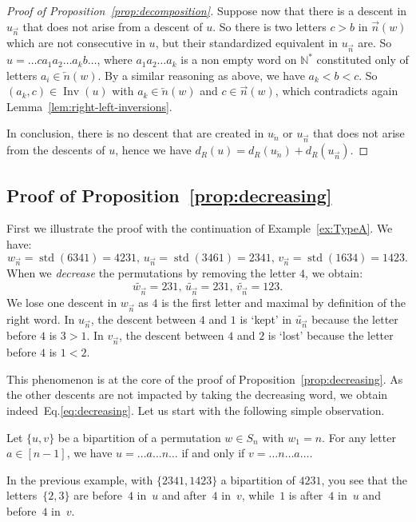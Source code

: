 \documentclass[Unicode]{cedram-alco}
\theoremstyle{definition}
\DeclareMathOperator{\std}{std}
\DeclareMathOperator{\invs}{Inv}
\newcommand{\dec}[1]{\widetilde{#1}}
\newcommand{\R}{{\overrightarrow{n}}}
\newcommand{\LL}{{\overleftarrow{n}}}
\newcommand{\dd}{d_R}
\begin{document}
\begin{proof}[Proof of Proposition~\ref{prop:decomposition}]
Suppose now that there is a descent in $u_\R$ that does not arise from a descent of $u$. So there is two letters $c > b$ in $\R(w)$ which are not consecutive in $u$, but their standardized equivalent in $u_\R$ are. So $u=\dots c a_1a_2\dots a_k b\dots$, where $a_1a_2\dots a_k$ is a non empty word on $\mathbb N^*$ constituted only of letters  $a_i\in\LL(w)$. By a similar reasoning as above, we have $a_k < b<c$. So $(a_k,c)\in\invs(u)$ with $a_k\in\LL(w)$ and $c\in\R(w)$, which contradicts again Lemma~\ref{lem:right-left-inversions}. 

In conclusion, there is no descent that are created in $u_\LL$ or $u_\R$ that does not arise from the descents of $u$, hence we have $\dd(u) = \dd(u_\LL) + \dd(u_\R).$
\end{proof}


\subsection{Proof of Proposition~\ref{prop:decreasing}} First we illustrate the proof with the continuation of Example~\ref{ex:TypeA}. We have:
$$
w_\R = \std(6341) = 4231, \, u_\R = \std(3461) = 2341, \, v_\R = \std(1634) = 1423.
$$
When we \emph{decrease} the permutations by removing the letter $4$, we obtain:
$$
\dec{w_\R} = 231, \,
\dec{u_\R} = 231, \,
\dec{v_\R} = 123.
$$
We lose one descent in $w_\R$ as $4$ is the first letter and maximal by definition of the right word. In $u_\R$, the descent between $4$ and $1$ is `kept' in $\dec{u_\R}$ because the letter before $4$ is $3 > 1$. In $v_\R$, the descent between $4$ and $2$ is `lost' because the letter before $4$ is $1 < 2$. 


This phenomenon is at the core of the proof of Proposition~\ref{prop:decreasing}. As the other descents are not impacted by taking the decreasing word, we obtain indeed~Eq.\eqref{eq:decreasing}. Let us start with the following simple observation.

\begin{lemm}
\label{lem:right-word-letters}
Let $\lbrace u, v \rbrace$ be a bipartition of a permutation $w \in S_n$ with $w_1 = n$. For any letter $a\in[n-1]$, we have $u=\dots a \dots n\dots$ if and only if $v=\dots n\dots a\dots$.
\end{lemm}

In the previous example, with $\lbrace 2341, 1423 \rbrace$ a bipartition of $4231$, you see that the letters~$\lbrace 2, 3 \rbrace$ are before~$4$ in~$u$ and after~$4$ in~$v$, while~$1$ is after~$4$ in~$u$ and before~$4$ in~$v$. 
\end{document}
